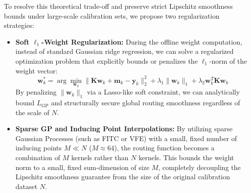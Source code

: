 \documentclass{article}
\theoremstyle{plain}
\theoremstyle{definition}
\theoremstyle{remark}
\begin{document}
To resolve this theoretical trade-off and preserve strict Lipschitz smoothness bounds under large-scale calibration sets, we propose two regularization strategies:
\begin{itemize}
    \item \textbf{Soft $\ell_1$-Weight Regularization:} During the offline weight computation, instead of standard Gaussian ridge regression, we can solve a regularized optimization problem that explicitly bounds or penalizes the $\ell_1$-norm of the weight vector:
    \begin{equation}
    \mathbf{w}_k^* = \arg\min_{\mathbf{w}_k} \|\mathbf{K}\mathbf{w}_k + \mathbf{m}_k - \mathbf{y}_k\|_2^2 + \lambda_1 \|\mathbf{w}_k\|_1 + \lambda_2 \mathbf{w}_k^T \mathbf{K} \mathbf{w}_k
    \end{equation}
    By penalizing $\|\mathbf{w}_k\|_1$ via a Lasso-like soft constraint, we can analytically bound $L_{\text{GP}}$ and structurally secure global routing smoothness regardless of the scale of $N$.
    \item \textbf{Sparse GP and Inducing Point Interpolations:} By utilizing sparse Gaussian Processes (such as FITC or VFE) with a small, fixed number of inducing points $M \ll N$ ($M \approx 64$), the routing function becomes a combination of $M$ kernels rather than $N$ kernels. This bounds the weight norm to a small, fixed sum-dimension of size $M$, completely decoupling the Lipschitz smoothness guarantee from the size of the original calibration dataset $N$.
\end{itemize}
\end{document}
